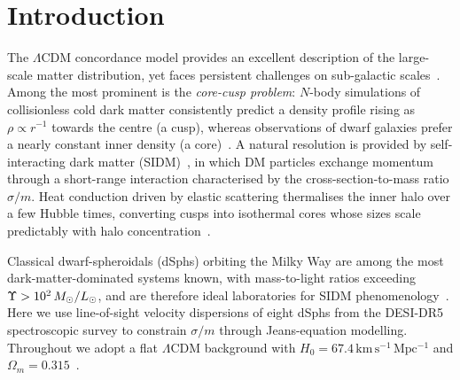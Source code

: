 \section{Introduction}
\label{sec:intro}

The $\Lambda$CDM concordance model provides an excellent description of the
large-scale matter distribution, yet faces persistent challenges on sub-galactic
scales~\cite{Weinberg2015}.
Among the most prominent is the \emph{core-cusp problem}: $N$-body simulations
of collisionless cold dark matter consistently predict a density profile rising
as $\rho\propto r^{-1}$ towards the centre (a cusp), whereas observations of
dwarf galaxies prefer a nearly constant inner density (a core)~\cite{Oh2015}.
A natural resolution is provided by self-interacting dark matter
(SIDM)~\cite{Spergel2000}, in which DM particles exchange momentum through a
short-range interaction characterised by the cross-section-to-mass ratio
$\sigma/m$.
Heat conduction driven by elastic scattering thermalises the inner halo over a
few Hubble times, converting cusps into isothermal cores whose sizes scale
predictably with halo concentration~\cite{Tulin2018,Kaplinghat2016}.

Classical dwarf-spheroidals (dSphs) orbiting the Milky Way are among the most
dark-matter-dominated systems known, with mass-to-light ratios exceeding
$\Upsilon > 10^{2}\,M_{\odot}/L_{\odot}$, and are therefore ideal laboratories for
SIDM phenomenology~\cite{Walker2009}.
Here we use line-of-sight velocity dispersions of eight dSphs from the DESI-DR5
spectroscopic survey to constrain $\sigma/m$ through Jeans-equation modelling.
Throughout we adopt a flat $\Lambda$CDM background with
$H_{0}=67.4\,\mathrm{km\,s^{-1}\,Mpc^{-1}}$ and $\Omega_{m}=0.315$~\cite{Planck2020}.

